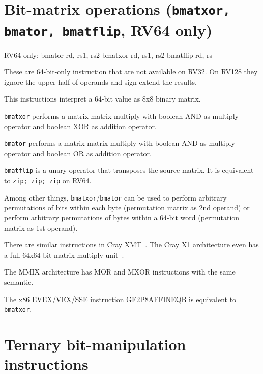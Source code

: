 \section{Bit-matrix operations (\texttt{bmatxor, bmator, bmatflip}, RV64 only)}

\begin{rvb}
  RV64 only:
    bmator rd, rs1, rs2
    bmatxor rd, rs1, rs2
    bmatflip rd, rs
\end{rvb}

These are 64-bit-only instruction that are not available on RV32. On RV128 they
ignore the upper half of operands and sign extend the results.

This instructions interpret a 64-bit value as 8x8 binary matrix.

\texttt{bmatxor} performs a matrix-matrix multiply with boolean AND as multiply
operator and boolean XOR as addition operator.

\texttt{bmator} performs a matrix-matrix multiply with boolean AND as multiply
operator and boolean OR as addition operator.

\texttt{bmatflip} is a unary operator that transposes the source matrix. It is
equivalent to \texttt{zip; zip; zip} on RV64.

Among other things, \texttt{bmatxor}/\texttt{bmator} can be used to perform
arbitrary permutations of bits within each byte (permutation matrix as 2nd
operand) or perform arbitrary permutations of bytes within a 64-bit word
(permutation matrix as 1st operand).

There are similar instructions in Cray XMT~\cite{CrayXMT}. The Cray X1
architecture even has a full 64x64 bit matrix multiply unit~\cite{CrayX1}.

The MMIX architecture has MOR and MXOR instructions with the same semantic.~\cite[p.~182f]{Knuth4A}

The x86 EVEX/VEX/SSE instruction GF2P8AFFINEQB is equivalent to {\tt bmatxor}.




\section{Ternary bit-manipulation instructions}


